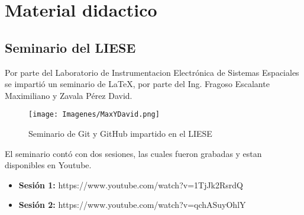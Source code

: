\chapter{Material didactico}

\section{Seminario del LIESE}

Por parte del Laboratorio de Instrumentacion Electrónica de Sistemas Espaciales se impartió un seminario de LaTeX, por parte del Ing. Fragoso Escalante Maximiliano y Zavala Pérez David.

\begin{figure}[H]
    \centering
    \texttt{[image: Imagenes/MaxYDavid.png]}
    \caption{Seminario de Git y GitHub impartido en el LIESE}
    \label{}
\end{figure}

El seminario contó con dos sesiones, las cuales fueron grabadas y estan disponibles en Youtube.

\begin{itemize}
    \item \textbf{Sesión 1:} https://www.youtube.com/watch?v=1TjJk2RsrdQ
    \item \textbf{Sesión 2:} https://www.youtube.com/watch?v=qchASuyOhlY
\end{itemize}
